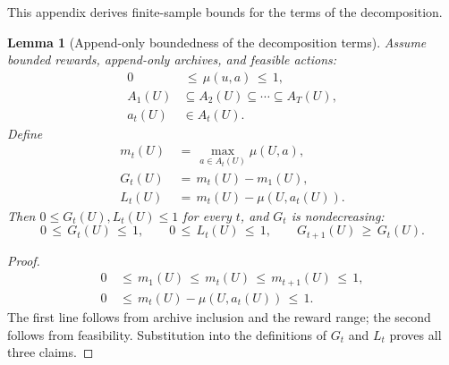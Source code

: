 \documentclass{article} %
\newtheorem{lemma}[theorem]{Lemma}
\begin{document}
\label{app:proofs6}

This appendix derives finite-sample bounds for the terms of the decomposition.

\begin{lemma}[Append-only boundedness of the decomposition terms]
\label{lem:15}
Assume bounded rewards, append-only archives, and feasible actions:
\begin{align}
\label{eq:app-six-bounded-mu}
0&\,\leq\,\mu(u,a)\,\leq\,1,
\\
\label{eq:app-six-append-only}
A_1(U)&\subseteq A_2(U)\subseteq\cdots\subseteq A_T(U),
\\
\label{eq:app-six-feasible-action}
a_t(U)&\in A_t(U).
\end{align}
Define
\begin{align}
\label{eq:app-six-current-optimum}
m_t(U)
&\,=\,
\max_{a\in A_t(U)}\mu(U,a),
\\
\label{eq:app-six-discovery-repeat}
G_t(U)
&\,=\,
m_t(U)-m_1(U),
\\
\label{eq:app-six-learning-repeat}
L_t(U)
&\,=\,
m_t(U)-\mu(U,a_t(U)).
\end{align}
Then \(0\leq G_t(U),L_t(U)\leq1\) for every \(t\), and \(G_t\) is
nondecreasing:
\begin{equation}
\label{eq:app-six-bounds-GL}
0\,\le\, G_t(U)\,\le\, 1,
\qquad
0\,\le\, L_t(U)\,\le\, 1,
\qquad
G_{t+1}(U)\,\ge\, G_t(U).
\end{equation}
\end{lemma}

\begin{proof}
\begin{equation}
\begin{aligned}
0
&\,\leq\,
m_1(U)
\,\leq\,
m_t(U)
\,\leq\,
m_{t+1}(U)
\,\leq\,
1,\\
0
&\,\leq\,
m_t(U)-\mu(U,a_t(U))
\,\leq\,
1.
\end{aligned}
\end{equation}
The first line follows from archive inclusion and the reward range; the
second follows from feasibility. Substitution into the definitions of
\(G_t\) and \(L_t\) proves all three claims.
\end{proof}
\end{document}
